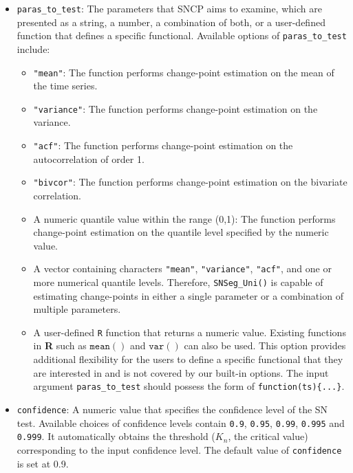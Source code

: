 \begin{itemize}
	\item \texttt{paras\_to\_test}: The parameters that SNCP aims to examine, which are presented as a string, a number, a combination of both, {or a user-defined function that defines a specific functional}. Available options of \texttt{paras\_to\_test} include:
	\begin{itemize}
		\item \texttt{"mean"}: The function performs change-point estimation on the mean of the time series.
		\item \texttt{"variance"}: The function performs change-point estimation on the variance.
		\item \texttt{"acf"}: The function performs change-point estimation on the autocorrelation of order 1.
		\item \texttt{"bivcor"}: The function performs change-point estimation on the bivariate correlation.
		\item A numeric quantile value within the range (0,1): The function performs change-point estimation on the quantile level specified by the numeric value.
		\item A vector containing characters \texttt{"mean"}, \texttt{"variance"}, \texttt{"acf"}, and one or more numerical quantile levels. Therefore, \texttt{SNSeg\_Uni()} is capable of estimating change-points in either a single parameter or a combination of multiple parameters.
            \item {A user-defined \texttt{R} function that returns a numeric value. Existing functions in \textbf{R} such as $\texttt{mean}()$ and $\texttt{var}()$ can also be used. This option provides additional flexibility for the users to define a specific functional that they are interested in and is not covered by our built-in options. The input argument \texttt{paras\_to\_test} should possess the form of \texttt{function(ts)\{...\}}. } 
	\end{itemize}	
	\item \texttt{confidence}: A numeric value that specifies the confidence level of the SN test. Available choices of confidence levels contain \texttt{0.9}, \texttt{0.95}, \texttt{0.99}, \texttt{0.995} and \texttt{0.999}. It automatically obtains the threshold ($K_n$, the critical value) corresponding  to the input confidence level. 
	The default value of \texttt{confidence} is set at 0.9.
	

\end{itemize}

